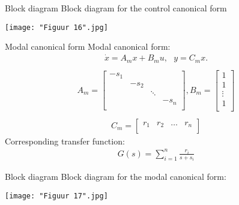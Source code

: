 \begin{frame}{Block diagram}
Block diagram for the control canonical form
\begin{center}
\texttt{[image: "Figuur 16".jpg]}
\end{center}

\end{frame}

\begin{frame}{Modal canonical form}
Modal canonical form:
\begin{align*}
\dot{x}=A_mx+B_mu,\text{ }y=C_mx.\\
\end{align*}
\vspace{-1cm}
\begin{align*}
A_m=\begin{bmatrix}
        {-s_1}&&&\\
        &{-s_2}&&\\
        &&\ddots&\\
        &&&{-s_n}\\
    \end{bmatrix}
,B_m=\begin{bmatrix}
            1\\
            1\\
            \vdots\\
            1\\
       \end{bmatrix}\\
\end{align*}
\vspace{-1.2cm}
\begin{align*}
C_m=\begin{bmatrix}
        r_1 & r_2 & \hdots & r_n\\
    \end{bmatrix}
\end{align*}
Corresponding transfer function:
\vspace{-0.2cm}
\begin{align*}
G(s)=\sum\limits_{i=1}^n \frac{r_i}{s+s_i}
\end{align*}
\end{frame}

\begin{frame}{Block diagram}
Block diagram for the modal canonical form:
\begin{center}
\texttt{[image: "Figuur 17".jpg]}
\end{center}
\end{frame}

